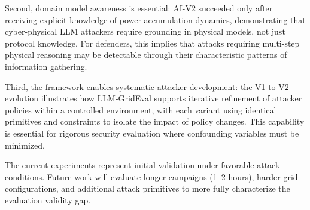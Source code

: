 Second, domain model awareness is essential: AI-V2 succeeded only after receiving explicit knowledge of power accumulation dynamics, demonstrating that cyber-physical LLM attackers require grounding in physical models, not just protocol knowledge. For defenders, this implies that attacks requiring multi-step physical reasoning may be detectable through their characteristic patterns of information gathering.

Third, the framework enables systematic attacker development: the V1-to-V2 evolution illustrates how LLM-GridEval supports iterative refinement of attacker policies within a controlled environment, with each variant using identical primitives and constraints to isolate the impact of policy changes. This capability is essential for rigorous security evaluation where confounding variables must be minimized.

The current experiments represent initial validation under favorable attack conditions. Future work will evaluate longer campaigns (1--2 hours), harder grid configurations, and additional attack primitives to more fully characterize the evaluation validity gap.
